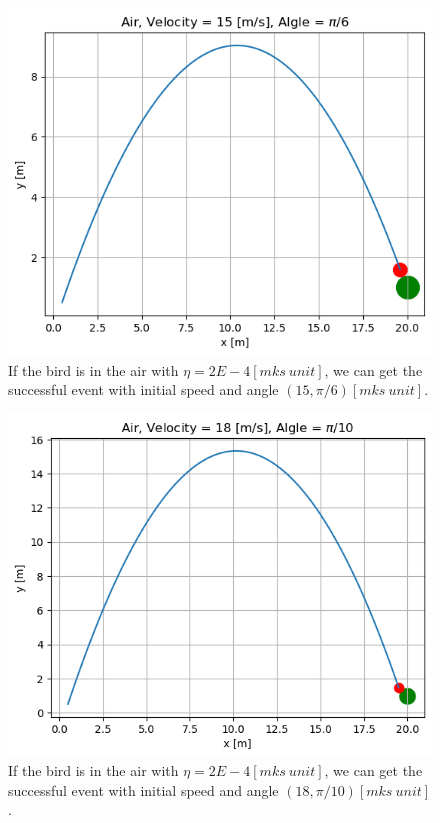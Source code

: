 \documentclass[12pt]{article}
\begin{document}
    \begin{figure}[H]
      \centering 
      \includegraphics[width = 12cm]{air1.png}
      \caption{If the bird is in the air with $\eta = 2E-4[mks\ unit]$, we can get the successful event with initial speed and angle $(15, \pi / 6) [mks\ unit]$.\label{air1}}
    \end{figure}

    \begin{figure}[H]
      \centering 
      \includegraphics[width = 12cm]{air2.png}
      \caption{If the bird is in the air with $\eta = 2E-4[mks\ unit]$, we can get the successful event with initial speed and angle $(18, \pi / 10) [mks\ unit]$.\label{air2}}
    \end{figure}
\end{document}
